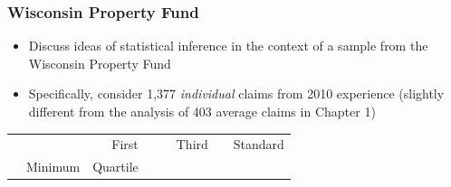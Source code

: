 \documentclass[]{book}
\begin{document}
\subsubsection{Wisconsin Property Fund}\label{wisconsin-property-fund}

\begin{itemize}
\item
  Discuss ideas of statistical inference in the context of a sample from
  the Wisconsin Property Fund
\item
  Specifically, consider 1,377 \emph{individual} claims from 2010
  experience (slightly different from the analysis of 403 average claims
  in Chapter 1)
\end{itemize}

\begin{longtable}[]{@{}llrllrlr@{}}
\toprule
\begin{minipage}[t]{0.12\columnwidth}\raggedright\strut
\strut
\end{minipage} & \begin{minipage}[t]{0.12\columnwidth}\raggedright\strut
\strut
\end{minipage} & \begin{minipage}[t]{0.12\columnwidth}\raggedleft\strut
First\strut
\end{minipage} & \begin{minipage}[t]{0.12\columnwidth}\raggedright\strut
\strut
\end{minipage} & \begin{minipage}[t]{0.12\columnwidth}\raggedright\strut
\strut
\end{minipage} & \begin{minipage}[t]{0.12\columnwidth}\raggedleft\strut
Third\strut
\end{minipage} & \begin{minipage}[t]{0.12\columnwidth}\raggedright\strut
\strut
\end{minipage} & \begin{minipage}[t]{0.12\columnwidth}\raggedleft\strut
Standard\strut
\end{minipage}\tabularnewline
\begin{minipage}[t]{0.12\columnwidth}\raggedright\strut
\strut
\end{minipage} & \begin{minipage}[t]{0.12\columnwidth}\raggedright\strut
Minimum\strut
\end{minipage} & \begin{minipage}[t]{0.12\columnwidth}\raggedleft\strut
Quartile\strut

\end{minipage}
\end{longtable}
\end{document}
